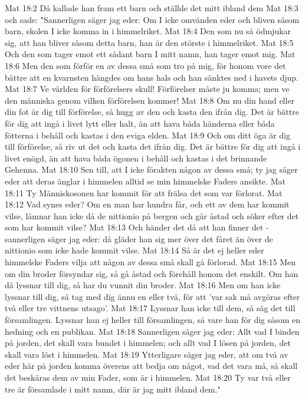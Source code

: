 Mat 18:2  Då kallade han fram ett barn och ställde det mitt ibland dem
Mat 18:3  och sade: "Sannerligen säger jag eder: Om I icke omvänden eder och bliven såsom barn, skolen I icke komma in i himmelriket.
Mat 18:4  Den som nu så ödmjukar sig, att han bliver såsom detta barn, han är den störste i himmelriket.
Mat 18:5  Och den som tager emot ett sådant barn I mitt namn, han tager emot mig.
Mat 18:6  Men den som förför en av dessa små som tro på mig, för honom vore det bättre att en kvarnsten hängdes om hans hals och han sänktes ned i havets djup.
Mat 18:7  Ve världen för förförelsers skull! Förförelser måste ju komma; men ve den människa genom vilken förförelsen kommer!
Mat 18:8  Om nu din hand eller din fot är dig till förförelse, så hugg av den och kasta den ifrån dig. Det är bättre för dig att ingå i livet lytt eller halt, än att hava båda händerna eller båda fötterna i behåll och kastas i den eviga elden.
Mat 18:9  Och om ditt öga är dig till förförelse, så riv ut det och kasta det ifrån dig. Det är bättre för dig att ingå i livet enögd, än att hava båda ögonen i behåll och kastas i det brinnande Gehenna.
Mat 18:10  Sen till, att I icke förakten någon av dessa små; ty jag säger eder att deras änglar i himmelen alltid se min himmelske Faders ansikte.
Mat 18:11  Ty Människosonen har kommit för att frälsa det som var förlorat.
Mat 18:12  Vad synes eder? Om en man har hundra får, och ett av dem har kommit vilse, lämnar han icke då de nittionio på bergen och går åstad och söker efter det som har kommit vilse?
Mat 18:13  Och händer det då att han finner det - sannerligen säger jag eder: då gläder han sig mer över det fåret än över de nittionio som icke hade kommit vilse.
Mat 18:14  Så är det ej heller eder himmelske Faders vilja att någon av dessa små skall gå förlorad.
Mat 18:15  Men om din broder försyndar sig, så gå åstad och förehåll honom det enskilt. Om han då lyssnar till dig, så har du vunnit din broder.
Mat 18:16  Men om han icke lyssnar till dig, så tag med dig ännu en eller två, för att 'var sak må avgöras efter två eller tre vittnens utsago'.
Mat 18:17  Lyssnar han icke till dem, så säg det till församlingen. Lyssnar han ej heller till församlingen, så vare han för dig såsom en hedning och en publikan.
Mat 18:18  Sannerligen säger jag eder: Allt vad I binden på jorden, det skall vara bundet i himmelen; och allt vad I lösen på jorden, det skall vara löst i himmelen.
Mat 18:19  Ytterligare säger jag eder, att om två av eder här på jorden komma överens att bedja om något, vad det vara må, så skall det beskäras dem av min Fader, som är i himmelen.
Mat 18:20  Ty var två eller tre är församlade i mitt namn, där är jag mitt ibland dem."
